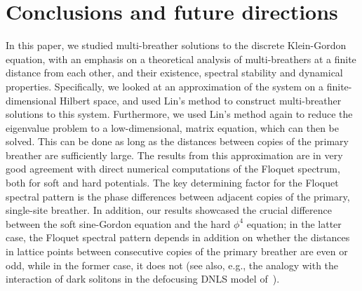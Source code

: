 \documentclass[12pt,reqno]{amsart}
\theoremstyle{definition}
\begin{document}
\section{Conclusions and future directions}\label{sec:conc}

In this paper, we studied multi-breather solutions to the discrete Klein-Gordon equation,
with an emphasis on a theoretical analysis of multi-breathers
at a finite distance from each other, and their existence, spectral stability and dynamical properties. Specifically, we looked at an approximation of the system on a finite-dimensional Hilbert space, and used Lin's method to construct multi-breather solutions to this system. Furthermore, we used Lin's method again to reduce the eigenvalue problem to a low-dimensional, matrix equation, which can then be solved. This can be done as long as the distances between copies of the primary breather are sufficiently large. The results from this approximation are in very good agreement with direct numerical computations of the Floquet spectrum, both for soft and hard potentials. The key determining factor for the Floquet spectral pattern is the phase differences between adjacent copies of the primary, single-site breather. In addition, our results
showcased the crucial difference between the soft sine-Gordon equation and the hard $\phi^4$ equation; in the latter case, the Floquet spectral pattern depends in addition on whether the distances in lattice points between consecutive copies of the primary breather are even or odd, while in the former case, it does 
not (see also, e.g., the analogy  with the interaction of dark
solitons in the defocusing DNLS model of~\cite{Pelinovsky_2008}). 
\end{document}
